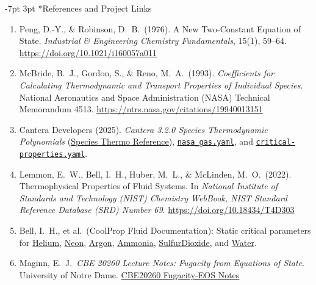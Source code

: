 \documentclass[10pt,a4paper]{article}
\makeatletter
\renewcommand\section{\@startsection {section}{1}{\z@}%
  {-7pt \@plus -2pt \@minus -1pt}%
  {3pt \@plus 1pt}%
  {\normalfont\large\bfseries\color{darkslate}}}
\makeatother
\begin{document}
\section*{References and Project Links}
\vspace{-2pt}
{\footnotesize
\begin{enumerate}\setlength{\itemsep}{1pt}\setlength{\parskip}{0pt}
  \item Peng, D.-Y., \& Robinson, D.\ B.\ (1976). A New Two-Constant Equation of State. \textit{Industrial \& Engineering Chemistry Fundamentals}, 15(1), 59--64. \href{https://doi.org/10.1021/i160057a011}{https://doi.org/10.1021/i160057a011}
  \item McBride, B.\ J., Gordon, S., \& Reno, M.\ A.\ (1993). \textit{Coefficients for Calculating Thermodynamic and Transport Properties of Individual Species}. National Aeronautics and Space Administration (NASA) Technical Memorandum 4513. \href{https://ntrs.nasa.gov/citations/19940013151}{https://ntrs.nasa.gov/citations/19940013151}
  \item Cantera Developers (2025). \textit{Cantera 3.2.0 Species Thermodynamic Polynomials} (\href{https://www.cantera.org/stable/reference/thermo/species-thermo.html}{Species Thermo Reference}), \href{https://github.com/Cantera/cantera/blob/v3.2.0/data/nasa_gas.yaml}{\texttt{nasa\_gas.yaml}}, and \href{https://github.com/Cantera/cantera/blob/v3.2.0/data/critical-properties.yaml}{\texttt{critical-properties.yaml}}.
  \item Lemmon, E.\ W., Bell, I.\ H., Huber, M.\ L., \& McLinden, M.\ O.\ (2022). Thermophysical Properties of Fluid Systems. In \textit{National Institute of Standards and Technology (NIST) Chemistry WebBook, NIST Standard Reference Database (SRD) Number 69}. \href{https://doi.org/10.18434/T4D303}{https://doi.org/10.18434/T4D303}
  \item Bell, I.\ H., et al.\ (CoolProp Fluid Documentation): Static critical parameters for \href{https://coolprop.org/fluid_properties/fluids/Helium.html}{Helium}, \href{https://coolprop.org/fluid_properties/fluids/Neon.html}{Neon}, \href{https://coolprop.org/fluid_properties/fluids/Argon.html}{Argon}, \href{https://coolprop.org/fluid_properties/fluids/Ammonia.html}{Ammonia}, \href{https://coolprop.org/fluid_properties/fluids/SulfurDioxide.html}{SulfurDioxide}, and \href{https://coolprop.org/fluid_properties/fluids/Water.html}{Water}.
  \item Maginn, E.\ J.\ \textit{CBE 20260 Lecture Notes: Fugacity from Equations of State}. University of Notre Dame. \href{https://ejmaginn.github.io/CBE20260-notes/class34/fugacity-EOS.html}{CBE20260 Fugacity-EOS Notes}

\end{enumerate}}
\end{document}
